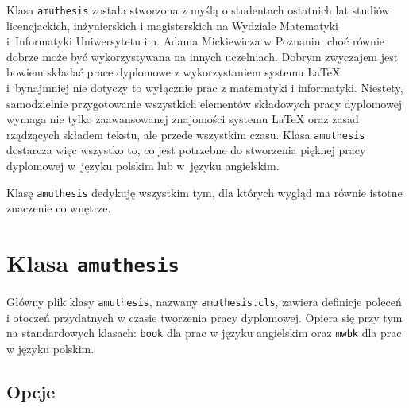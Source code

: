 \documentclass[oneside,polski]{amuthesis}
\author{Bartłomiej Przybylski}
\date{Poznań, wrzesień 2017}
\begin{document}
\maketitle

\makestatement

\begin{streszczenie}
Klasa \texttt{amuthesis} została stworzona z myślą o studentach ostatnich lat studiów licencjackich, inżynierskich i magisterskich na Wydziale Matematyki i~Informatyki Uniwersytetu im. Adama Mickiewicza w Poznaniu, choć równie dobrze może być wykorzystywana na innych uczelniach. Dobrym zwyczajem jest bowiem składać prace dyplomowe z wykorzystaniem systemu \LaTeX{} i~bynajmniej nie dotyczy to wyłącznie prac z matematyki i informatyki. Niestety, samodzielnie przygotowanie wszystkich elementów składowych pracy dyplomowej wymaga nie tylko zaawansowanej znajomości systemu \LaTeX{} oraz zasad rządzących składem tekstu, ale przede wszystkim czasu. Klasa \texttt{amuthesis} dostarcza więc wszystko to, co jest potrzebne do stworzenia pięknej pracy dyplomowej w~języku polskim lub w~języku angielskim.
\end{streszczenie}

\begin{abstract}
\lipsum[1]
\end{abstract}

\begin{dedykacja}
Klasę \texttt{amuthesis} dedykuję wszystkim tym, dla których wygląd ma równie istotne znaczenie co wnętrze.
\end{dedykacja}

\tableofcontents

\chapter{Klasa \texttt{amuthesis}}

Główny plik klasy \texttt{amuthesis}, nazwany \texttt{amuthesis.cls}, zawiera definicje poleceń i otoczeń przydatnych w czasie tworzenia pracy dyplomowej. Opiera się przy tym na standardowych klasach: \texttt{book} dla prac w języku angielskim oraz \texttt{mwbk} dla prac w języku polskim.

\section{Opcje}
\end{document}
